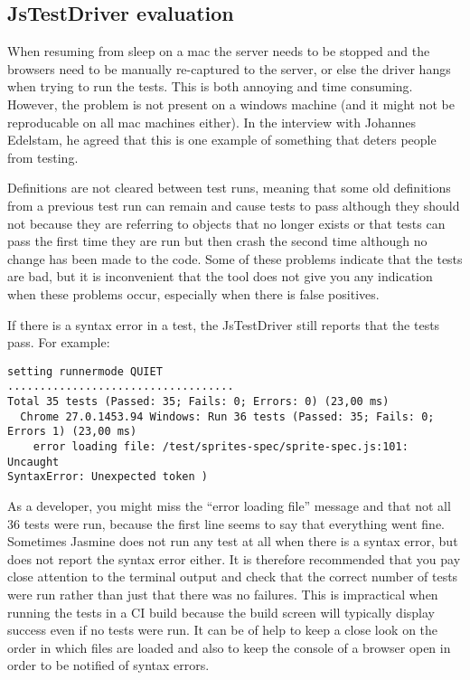 \documentclass[11pt]{article}
\begin{document}
\subsection{JsTestDriver evaluation}

When resuming from sleep on a mac the server needs to be stopped and the browsers need to be manually re-captured to the server, or else the driver hangs when trying to run the tests. This is both annoying and time consuming. However, the problem is not present on a windows machine (and it might not be reproducable on all mac machines either). In the interview with Johannes Edelstam, he agreed that this is one example of something that deters people from testing\cite{Edelstam}.

Definitions are not cleared between test runs, meaning that some old definitions from a previous test run can remain and cause tests to pass although they should not because they are referring to objects that no longer exists or that tests can pass the first time they are run but then crash the second time although no change has been made to the code. Some of these problems indicate that the tests are bad, but it is inconvenient that the tool does not give you any indication when these problems occur, especially when there is false positives.

If there is a syntax error in a test, the JsTestDriver still reports that the tests pass. For example:

\begin{verbatim}
setting runnermode QUIET
...................................
Total 35 tests (Passed: 35; Fails: 0; Errors: 0) (23,00 ms)
  Chrome 27.0.1453.94 Windows: Run 36 tests (Passed: 35; Fails: 0;
Errors 1) (23,00 ms)
    error loading file: /test/sprites-spec/sprite-spec.js:101: Uncaught
SyntaxError: Unexpected token )
\end{verbatim}

As a developer, you might miss the ``error loading file'' message and that not all 36 tests were run, because the first line seems to say that everything went fine. Sometimes Jasmine does not run any test at all when there is a syntax error, but does not report the syntax error either. It is therefore recommended that you pay close attention to the terminal output and check that the correct number of tests were run rather than just that there was no failures. This is impractical when running the tests in a CI build because the build screen will typically display success even if no tests were run. It can be of help to keep a close look on the order in which files are loaded and also to keep the console of a browser open in order to be notified of syntax errors\cite{MikeJansen}.
\end{document}
